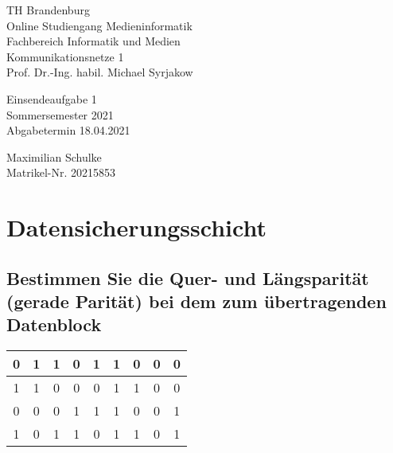 \documentclass{article}
\begin{document}
\begin{titlepage}
	\begin{flushleft}
		TH Brandenburg \\
		Online Studiengang Medieninformatik \\
		Fachbereich Informatik und Medien \\
		Kommunikationsnetze 1 \\
		Prof. Dr.-Ing. habil. Michael Syrjakow
	\end{flushleft}

	\vfill

	\begin{center}
		\Large{Einsendeaufgabe 1}\\[0.5em]
		\large{Sommersemester 2021}\\[0.25em]
		\large{Abgabetermin 18.04.2021}
	\end{center}

	\vfill

	\begin{flushright}
		Maximilian Schulke \\
		Matrikel-Nr. 20215853
	\end{flushright}
\end{titlepage}

\newpage

\section{Datensicherungsschicht}

\subsection{Bestimmen Sie die Quer- und Längsparität (gerade Parität) bei dem zum übertragenden Datenblock}

\begin{center}
	\begin{tabular}{|c|c|c|c|c|c|c|c|c|}
		\hline
		0                    & 1                    & 1                    & 0                    & 1                    & 1                    & 0                    & 0                    & \cellcolor{gray!25}0 \\
		\hline
		1                    & 1                    & 0                    & 0                    & 0                    & 1                    & 1                    & 0                    & \cellcolor{gray!25}0 \\
		\hline
		0                    & 0                    & 0                    & 1                    & 1                    & 1                    & 0                    & 0                    & \cellcolor{gray!25}1 \\
		\hline
		\cellcolor{gray!25}1 & \cellcolor{gray!25}0 & \cellcolor{gray!25}1 & \cellcolor{gray!25}1 & \cellcolor{gray!25}0 & \cellcolor{gray!25}1 & \cellcolor{gray!25}1 & \cellcolor{gray!25}0 & \cellcolor{gray!25}1 \\
		\hline
	\end{tabular}
\end{center}
\end{document}
